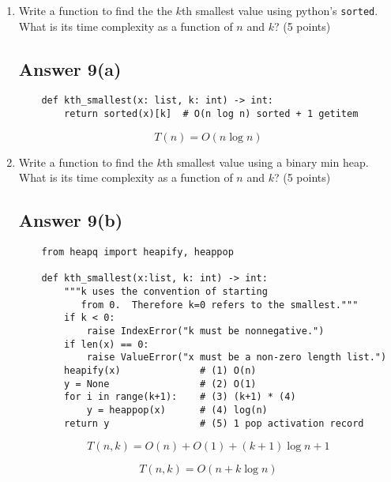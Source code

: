 \documentclass{article}
\begin{document}
\begin{enumerate}[label=(\alph*)]
\item Write a function to find the the $k$th 
  smallest value using python's \verb|sorted|.  What is its time complexity
  as a function of $n$ and $k$? (5 points)

\subsection*{Answer 9(a)}

\begin{verbatim}
    def kth_smallest(x: list, k: int) -> int:
        return sorted(x)[k]  # O(n log n) sorted + 1 getitem
\end{verbatim}

\begin{equation}
  \boxed{T(n) = O(n \log n)}
\end{equation}

\item Write a function to find the $k$th smallest value using a binary
  min heap.  What is its time complexity as a function of $n$ and $k$?
  (5 points)

\subsection*{Answer 9(b)}

\begin{verbatim}
    from heapq import heapify, heappop

    def kth_smallest(x:list, k: int) -> int:
        """k uses the convention of starting
           from 0.  Therefore k=0 refers to the smallest."""
        if k < 0:
            raise IndexError("k must be nonnegative.")
        if len(x) == 0:
            raise ValueError("x must be a non-zero length list.")
        heapify(x)              # (1) O(n)
        y = None                # (2) O(1)
        for i in range(k+1):    # (3) (k+1) * (4)
            y = heappop(x)      # (4) log(n)
        return y                # (5) 1 pop activation record
\end{verbatim}

\begin{equation*}
  T(n, k) = O(n) + O(1) + (k+1) \log n + 1
\end{equation*}

\begin{equation}
  \boxed{T(n, k) = O(n + k \log n)}
\end{equation}

\end{enumerate}
\end{document}
